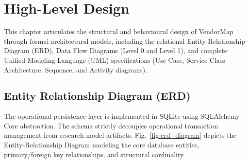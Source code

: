 \chapter{High-Level Design}
\label{ch:high_level_design}

This chapter articulates the structural and behavioural design of VendorMap through formal architectural models, including the relational Entity-Relationship Diagram (ERD), Data Flow Diagrams (Level 0 and Level 1), and complete Unified Modeling Language (UML) specifications (Use Case, Service Class Architecture, Sequence, and Activity diagrams).

\section{Entity Relationship Diagram (ERD)}
\label{sec:erd}

The operational persistence layer is implemented in SQLite using SQLAlchemy Core abstraction. The schema strictly decouples operational transaction management from research model artifacts. Fig.~\ref{fig:erd_diagram} depicts the Entity-Relationship Diagram modeling the core database entities, primary/foreign key relationships, and structural cardinality.

